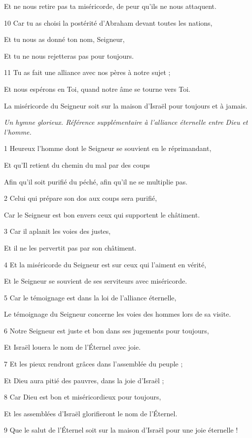 \par     Et ne nous retire pas ta miséricorde, de peur qu’ils ne nous attaquent.
\par 10 Car tu as choisi la postérité d'Abraham devant toutes les nations,
\par     Et tu nous as donné ton nom, Seigneur,
\par     Et tu ne nous rejetteras pas pour toujours.
\par 11 Tu as fait une alliance avec nos pères à notre sujet ;
\par     Et nous espérons en Toi, quand notre âme se tourne vers Toi.
\par     La miséricorde du Seigneur soit sur la maison d'Israël pour toujours et à jamais.


\par \textit{Un hymne glorieux. Référence supplémentaire à l'alliance éternelle entre Dieu et l'homme.}

\par 1 Heureux l'homme dont le Seigneur se souvient en le réprimandant,
\par     Et qu'Il retient du chemin du mal par des coups
\par     Afin qu'il soit purifié du péché, afin qu'il ne se multiplie pas.
\par 2 Celui qui prépare son dos aux coups sera purifié,
\par     Car le Seigneur est bon envers ceux qui supportent le châtiment.
\par 3 Car il aplanit les voies des justes,
\par     Et il ne les pervertit pas par son châtiment.
\par 4 Et la miséricorde du Seigneur est sur ceux qui l'aiment en vérité,
\par     Et le Seigneur se souvient de ses serviteurs avec miséricorde.
\par 5 Car le témoignage est dans la loi de l'alliance éternelle,
\par     Le témoignage du Seigneur concerne les voies des hommes lors de sa visite.
\par 6 Notre Seigneur est juste et bon dans ses jugements pour toujours,
\par     Et Israël louera le nom de l'Éternel avec joie.
\par 7 Et les pieux rendront grâces dans l'assemblée du peuple ;
\par     Et Dieu aura pitié des pauvres, dans la joie d'Israël ;
\par 8 Car Dieu est bon et miséricordieux pour toujours,
\par     Et les assemblées d'Israël glorifieront le nom de l'Éternel.
\par   
\par 9 Que le salut de l'Éternel soit sur la maison d'Israël pour une joie éternelle !

